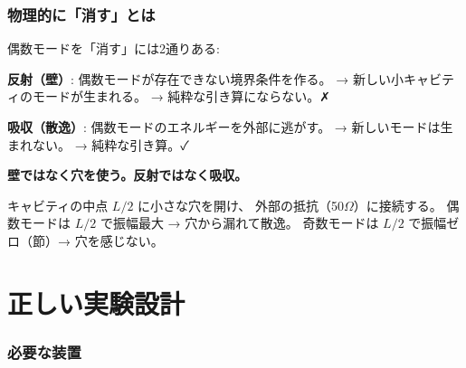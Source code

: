 \documentclass[12pt,a4paper]{article}
\begin{document}
\section{物理的に「消す」とは}

偶数モードを「消す」には2通りある:

\textbf{反射（壁）}: 偶数モードが存在できない境界条件を作る。
→ 新しい小キャビティのモードが生まれる。
→ 純粋な引き算にならない。✗

\textbf{吸収（散逸）}: 偶数モードのエネルギーを外部に逃がす。
→ 新しいモードは生まれない。
→ 純粋な引き算。✓

\begin{resultbox}[核心]
\textbf{壁ではなく穴を使う。反射ではなく吸収。}

キャビティの中点 $L/2$ に小さな穴を開け、
外部の抵抗（50$\Omega$）に接続する。
偶数モードは $L/2$ で振幅最大 → 穴から漏れて散逸。
奇数モードは $L/2$ で振幅ゼロ（節）→ 穴を感じない。
\end{resultbox}

\part{正しい実験設計}

\section{必要な装置}
\end{document}
